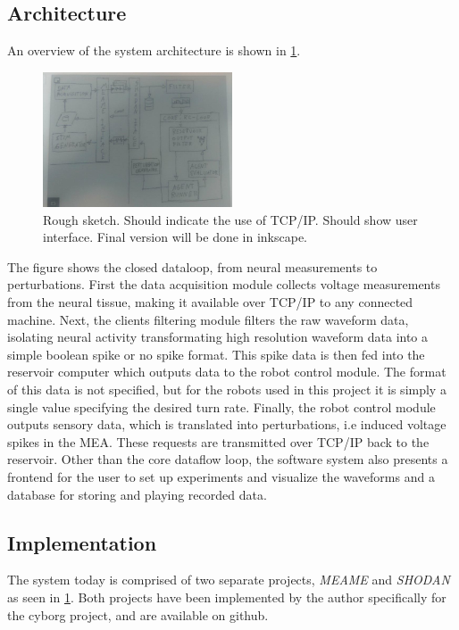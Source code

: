\subsection{Architecture}
An overview of the system architecture is shown in \ref{figOverview}.
\begin{figure}[h!]
  \centering
  \includegraphics[width=0.5\textwidth]{fig/rm/sw_arc.jpg}
  \caption{Rough sketch.
    Should indicate the use of TCP/IP.
    Should show user interface.
    Final version will be done in inkscape.
  }
  \label{figOverview}
\end{figure}
The figure shows the closed dataloop, from neural measurements to perturbations.
First the data acquisition module collects voltage measurements from the neural
tissue, making it available over TCP/IP to any connected machine.
%
Next, the clients filtering module filters the raw waveform data, isolating
neural activity transformating high resolution waveform data into a simple
boolean spike or no spike format.
%
This spike data is then fed into the reservoir computer which outputs data to
the robot control module.
The format of this data is not specified, but for the robots used in this
project it is simply a single value specifying the desired turn rate.
%
Finally, the robot control module outputs sensory data, which is translated into
perturbations, i.e induced voltage spikes in the MEA.
These requests are transmitted over TCP/IP back to the reservoir.
%
Other than the core dataflow loop, the software system also presents a frontend
for the user to set up experiments and visualize the waveforms and a database
for storing and playing recorded data.
\subsection{Implementation}
The system today is comprised of two separate projects, \emph{MEAME} and
\emph{SHODAN} as seen in \ref{figOverview}.
Both projects have been implemented by the author specifically for the cyborg
project, and are available on github.
%
%
